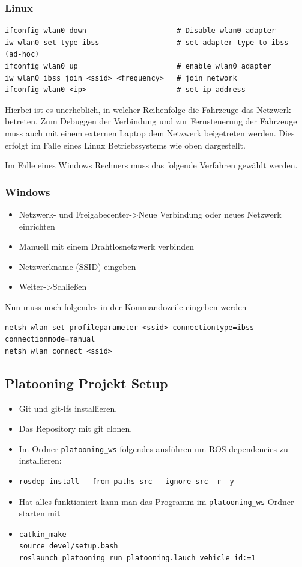 \documentclass[a4paper, 12pt, titlepage]{scrartcl}
\begin{document}
	\subsubsection*{Linux}
	\begin{lstlisting}
ifconfig wlan0 down 					# Disable wlan0 adapter
iw wlan0 set type ibss					# set adapter type to ibss (ad-hoc)
ifconfig wlan0 up						# enable wlan0 adapter
iw wlan0 ibss join <ssid> <frequency>	# join network
ifconfig wlan0 <ip>						# set ip address
	\end{lstlisting}
	Hierbei ist es unerheblich, in welcher Reihenfolge die Fahrzeuge das Netzwerk betreten. 
	Zum Debuggen der Verbindung und zur Fernsteuerung der Fahrzeuge muss auch mit einem externen Laptop dem 
	Netzwerk beigetreten werden. Dies erfolgt im Falle eines Linux Betriebssystems wie oben dargestellt.
	
	Im Falle eines Windows Rechners muss das folgende Verfahren gewählt werden.
	\subsubsection*{Windows}	
	\begin{itemize}
	\item Netzwerk- und Freigabecenter->Neue Verbindung oder neues Netzwerk einrichten
	\item Manuell mit einem Drahtlosnetzwerk verbinden
	\item Netzwerkname (SSID) eingeben
	\item Weiter->Schließen
	\end{itemize}
	Nun muss noch folgendes in der Kommandozeile eingeben werden
	\begin{lstlisting}
netsh wlan set profileparameter <ssid> connectiontype=ibss connectionmode=manual
netsh wlan connect <ssid>
	\end{lstlisting}
	\subsection{Platooning Projekt Setup}
	\begin{itemize}
		\item Git und git-lfs installieren.
		\item Das Repository mit git clonen.
		\item Im Ordner \texttt{platooning\_ws} folgendes ausführen um ROS dependencies zu installieren:
		\item[] \begin{lstlisting}
rosdep install --from-paths src --ignore-src -r -y
		\end{lstlisting}
		\item Hat alles funktioniert kann man das Programm im \texttt{platooning\_ws} Ordner starten mit
		\item[] \begin{lstlisting}
catkin_make
source devel/setup.bash
roslaunch platooning run_platooning.lauch vehicle_id:=1
		\end{lstlisting}
	\end{itemize}
\end{document}
